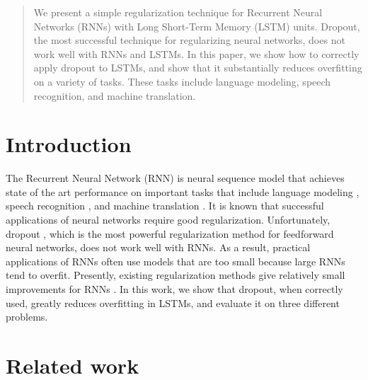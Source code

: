 \documentclass{article}
\begin{document}
 


\begin{abstract} 
  We present a simple regularization technique for Recurrent Neural
  Networks (RNNs) with Long Short-Term Memory (LSTM) units.  Dropout,
  the most successful technique for regularizing neural networks, does
  not work well with RNNs and LSTMs.  In this paper, we show how to
  correctly apply dropout to LSTMs, and show that it
  substantially reduces overfitting on a variety of tasks. These tasks
  include language modeling, speech recognition, and machine
  translation.
\end{abstract} 

\section{Introduction}

The Recurrent Neural Network (RNN) is neural sequence model that achieves state of the art
performance on important tasks that include language modeling
\cite{mikolov2012statistical}, speech recognition
\cite{graves2013speech}, and machine translation
\cite{kal13}.  It is known that successful applications of
neural networks require good regularization. Unfortunately, dropout
\cite{srivastava2013improving}, which is the most powerful regularization method
for feedforward neural networks, does not work well with
RNNs. As a result, practical applications of RNNs often
use models that are too small because large RNNs tend to overfit.  
Presently, existing regularization methods give relatively small improvements for
RNNs \cite{graves2013generating}.
In this work, we show that dropout, when correctly used,
greatly reduces overfitting in LSTMs, and evaluate it on three different problems.

\section{Related work}
\end{document}

